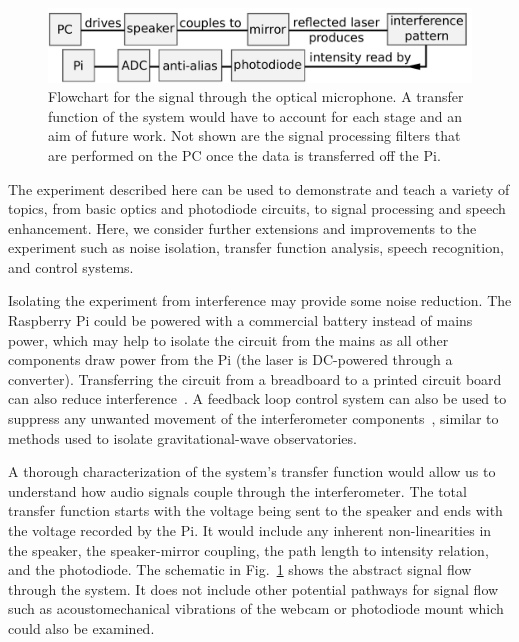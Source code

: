 \documentclass[paper-main.tex]{subfiles}
\begin{document}
\begin{figure}
    \includegraphics[width=.8\textwidth]{figures/pipeline_nobox.pdf}
	\caption{\label{fig:pipeline_highlighted}
Flowchart for the signal through the optical microphone. 
A transfer function of the system would have to account for each stage and an aim of future work. 
Not shown are the signal processing filters that are performed on the PC once the data is transferred off the Pi.
}
\end{figure}

The experiment described here can be used to demonstrate and teach a variety of topics, from basic optics and photodiode circuits, to signal processing and speech enhancement. 
Here, we consider further extensions and improvements to the experiment such as noise isolation, transfer function analysis, speech recognition, and control systems.



Isolating the experiment from interference may provide some noise reduction. 
The Raspberry Pi could be powered with a commercial battery instead of mains power, which may help to isolate the circuit from the mains as all other components draw power from the Pi (the laser is DC-powered through a converter).
Transferring the circuit from a breadboard to a printed circuit board can also reduce interference~\cite{elfekey2013design}.
A feedback loop control system can also be used to suppress any unwanted movement of the interferometer components~\citep{abbott2017exploring, Sekiguchi:2016bmv, verhoeven2009robust}, similar to methods used to isolate gravitational-wave observatories. 


A thorough characterization of the system's transfer function would allow us to understand how audio signals couple through the interferometer. 
The total transfer function starts with the voltage being sent to the speaker and ends with the voltage recorded by the Pi. 
It would include any inherent non-linearities in the speaker, the speaker-mirror coupling, the path length to intensity relation, and the photodiode. 
The schematic in Fig.~\ref{fig:pipeline_highlighted} shows the abstract signal flow through the system.
It does not include other potential pathways for signal flow such as acoustomechanical vibrations of the webcam or photodiode mount which could also be examined.
\end{document}

